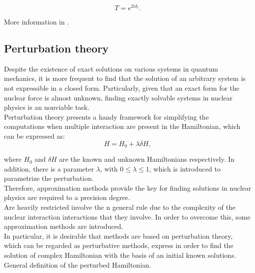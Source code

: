 \documentclass[openany]{book}
\begin{document}
\begin{equation} \label{eq:tunneling_transmissionProbability}
	T = e^{2i\delta_l}.
\end{equation}

More information in \cite{newton_2002}.

\subsection{Perturbation theory}\label{sub:perturbationTheory}

Despite the existence of exact solutions on various systems in quantum mechanics, it is more frequent to find that the solution of an arbitrary system is not expressible in a closed form. Particularly, given that an exact form for the nuclear force is almost unknown, finding exactly solvable systems in nuclear physics is an nonviable task. \\

Perturbation theory presents a handy framework for simplifying the computations when multiple interaction are present in the Hamiltonian, which can be expressed as: \\

\begin{equation} \label{eq:perturbationTheory_hamiltonian}
	H = H_0 + \lambda \delta H,
\end{equation}

where $H_0$ and $\delta H$ are the known and unknown Hamiltonians respectively. In addition, there is a parameter $\lambda$, with $0 \le \lambda \le 1$, which is introduced to parametrize the perturbation. \\

Therefore, approximation methods provide the key for finding solutions in nuclear physics are required to a precision degree. \\

Are heavily restricted  involve the n  general rule due to the complexity of the nuclear interaction interactions that they involve. In order to overcome this, some approximation methods are introduced. \\

In particular, it is desirable that methods are based on perturbation theory, which can be regarded as perturbative methods, express   in order to find the solution of complex Hamiltonian with the basis of an initial known solutions. \\

General definition of the perturbed Hamiltonian. \\
\end{document}
